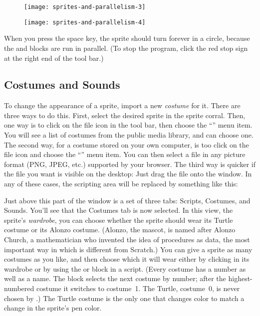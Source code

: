 \documentclass{report}
\begin{document}
\begin{figure}[H]
\begin{minipage}{0.5\textwidth}
\centering
\texttt{[image: sprites-and-parallelism-3]}
\end{minipage}%
\begin{minipage}{0.5\textwidth}
\centering
\texttt{[image: sprites-and-parallelism-4]}
\end{minipage}
\end{figure}

When you press the space key, the sprite should turn forever in a circle, because the  and  blocks are run in parallel. (To stop the program, click the red stop sign  at the right end of the tool bar.)

\subsection{Costumes and Sounds}

To change the appearance of a sprite, import a new \emph{costume} for it. There are three ways to do this. First, select the desired sprite in the sprite corral. Then, one way is to click on the file icon  in the tool bar, then choose the ``'' menu item. You will see a list of costumes from the public media library, and can choose one. The second way, for a costume stored on your own computer, is too click on the file icon and choose the ``'' menu item. You can then select a file in any picture format (PNG, JPEG, etc.) supported by your browser. The third way is quicker if the file you want is visible on the desktop: Just drag the file onto the \Snap{} window. In any of these cases, the scripting area will be replaced by something like this:\nopagebreak


Just above this part of the window is a set of three tabs: Scripts, Costumes, and Sounds. You'll see that the Costumes tab is now selected. In this view, the sprite's \emph{wardrobe}, you can choose whether the sprite should wear its Turtle costume or its Alonzo costume. (Alonzo, the \Snap{} mascot, is named after Alonzo Church, a mathematician who invented the idea of procedures as data, the most important way in which \Snap{} is different from Scratch.) You can give a sprite as many costumes as you like, and then choose which it will wear either by clicking in its wardrobe or by using the  or  block in a script. (Every costume has a number as well as a name. The  block selects the next costume by number; after the highest-numbered costume it switches to costume~1. The Turtle, costume~0, is never chosen by .) The Turtle costume is the only one that changes color to match a change in the sprite's pen color.
\end{document}
